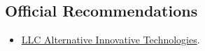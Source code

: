 \documentclass{vl}
\begin{document}
    \subsection*{Official Recommendations}
    \begin{itemize}
        \item \href{https://github.com/volodya-lombrozo/volodya-lombrozo.github.io/blob/24eb2bbed8fac71c90ddef6ff4d93de8fb4f9f26/_cv/recommendations/letter_of_recommendation_ait.pdf}{LLC Alternative Innovative Technologies}.
    \end{itemize}
\end{document}
